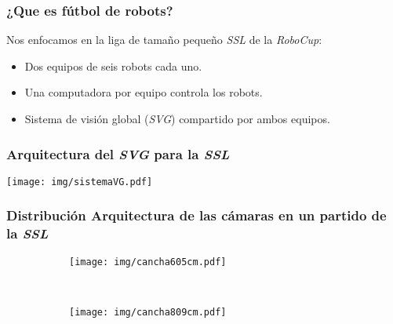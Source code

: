 \documentclass[11pt,a4paper,spanish]{beamer}
\begin{document}
\begin{frame}

\frametitle{¿Que es fútbol de robots?}

	Nos enfocamos en la liga de tamaño pequeño \emph{SSL} de la
	\emph{RoboCup}:

\begin{itemize}

	\item Dos equipos de seis robots cada uno.

	\item Una computadora por equipo controla los robots.

	\item Sistema de visión global (\emph{SVG}) compartido por ambos
		equipos.

\end{itemize}

\end{frame}

\begin{frame}

\frametitle{Arquitectura del \emph{SVG} para la \emph{SSL}}

\texttt{[image: img/sistemaVG.pdf]}

\end{frame}

\begin{frame}

\frametitle{Distribución Arquitectura de las cámaras en un partido de la \emph{SSL}}

\begin{figure}[h]

	\centering

	\begin{subfigure}[c]{0.40\textwidth}
		\centering
		\texttt{[image: img/cancha605cm.pdf]}
	\end{subfigure}
	~
	\begin{subfigure}[c]{0.40\textwidth}
		\centering
		\texttt{[image: img/cancha809cm.pdf]}
	\end{subfigure}

\end{figure}

\end{frame}
\end{document}
